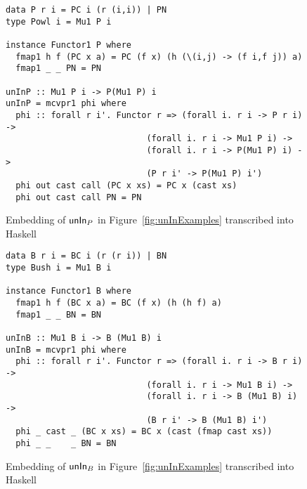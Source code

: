 \begin{figure}
\begin{singlespace}
\begin{lstlisting}
data P r i = PC i (r (i,i)) | PN
type Powl i = Mu1 P i

instance Functor1 P where
  fmap1 h f (PC x a) = PC (f x) (h (\(i,j) -> (f i,f j)) a)
  fmap1 _ _ PN = PN

unInP :: Mu1 P i -> P(Mu1 P) i
unInP = mcvpr1 phi where
  phi :: forall r i'. Functor r => (forall i. r i -> P r i) ->
                            (forall i. r i -> Mu1 P i) ->
                            (forall i. r i -> P(Mu1 P) i) ->
                            (P r i' -> P(Mu1 P) i')
  phi out cast call (PC x xs) = PC x (cast xs)
  phi out cast call PN = PN
\end{lstlisting}
\end{singlespace}
\caption{Embedding of $\mathsf{unIn}_P$ in Figure~\ref{fig:unInExamples}
	transcribed into Haskell}
\label{fig:HaskellunInP}
\end{figure}


\begin{figure}
\begin{singlespace}
\begin{lstlisting}
data B r i = BC i (r (r i)) | BN
type Bush i = Mu1 B i

instance Functor1 B where
  fmap1 h f (BC x a) = BC (f x) (h (h f) a)
  fmap1 _ _ BN = BN

unInB :: Mu1 B i -> B (Mu1 B) i
unInB = mcvpr1 phi where
  phi :: forall r i'. Functor r => (forall i. r i -> B r i) ->
                            (forall i. r i -> Mu1 B i) ->
                            (forall i. r i -> B (Mu1 B) i) ->
                            (B r i' -> B (Mu1 B) i')
  phi _ cast _ (BC x xs) = BC x (cast (fmap cast xs))
  phi _ _    _ BN = BN
\end{lstlisting}
\end{singlespace}
\caption{Embedding of $\mathsf{unIn}_B$ in Figure~\ref{fig:unInExamples}
	transcribed into Haskell}
\label{fig:HaskellunInB}
\end{figure}

